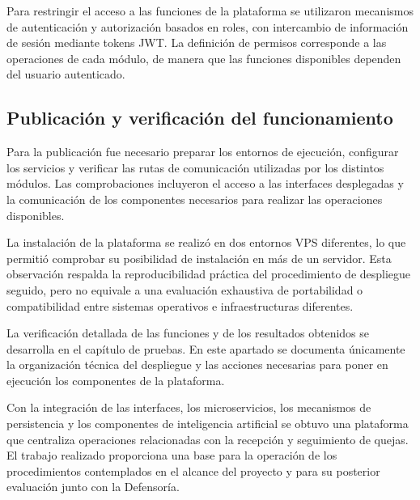Para restringir el acceso a las funciones de la plataforma se utilizaron mecanismos de autenticación y autorización basados en roles, con intercambio de información de sesión mediante tokens JWT. La definición de permisos corresponde a las operaciones de cada módulo, de manera que las funciones disponibles dependen del usuario autenticado.


\subsection{Publicación y verificación del funcionamiento}
\label{subsec:despliegue_verificacion}

Para la publicación fue necesario preparar los entornos de ejecución, configurar los servicios y verificar las rutas de comunicación utilizadas por los distintos módulos. Las comprobaciones incluyeron el acceso a las interfaces desplegadas y la comunicación de los componentes necesarios para realizar las operaciones disponibles.

La instalación de la plataforma se realizó en dos entornos VPS diferentes, lo que permitió comprobar su posibilidad de instalación en más de un servidor. Esta observación respalda la reproducibilidad práctica del procedimiento de despliegue seguido, pero no equivale a una evaluación exhaustiva de portabilidad o compatibilidad entre sistemas operativos e infraestructuras diferentes.

La verificación detallada de las funciones y de los resultados obtenidos se desarrolla en el capítulo de pruebas. En este apartado se documenta únicamente la organización técnica del despliegue y las acciones necesarias para poner en ejecución los componentes de la plataforma.

Con la integración de las interfaces, los microservicios, los mecanismos de persistencia y los componentes de inteligencia artificial se obtuvo una plataforma que centraliza operaciones relacionadas con la recepción y seguimiento de quejas. El trabajo realizado proporciona una base para la operación de los procedimientos contemplados en el alcance del proyecto y para su posterior evaluación junto con la Defensoría.